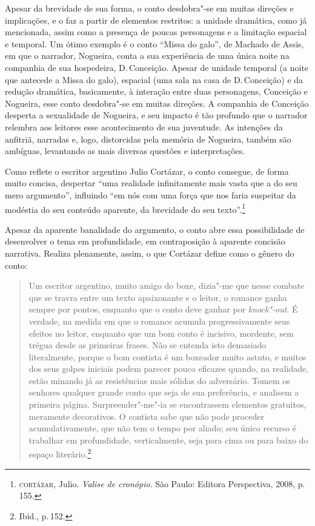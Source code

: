 Apesar da brevidade de sua forma, o conto desdobra"-se em muitas direções e implicações, e o faz a partir de elementos restritos: a unidade dramática, como já mencionada, assim como a presença de poucas personagens e a limitação espacial e temporal. Um ótimo exemplo é o conto ``Missa do galo'', de Machado de Assis, em que o narrador, Nogueira, conta a sua experiência de uma única noite na companhia de sua hospedeira, D.\,Conceição. Apesar de unidade temporal (a noite que antecede a Missa do galo), espacial (uma sala na casa de D.\,Conceição) e da redução dramática, basicamente, à interação entre duas personagens, Conceição e Nogueira, esse conto desdobra"-se em muitas direções. A companhia de Conceição desperta a sexualidade de Nogueira, e seu impacto é tão profundo que o narrador relembra aos leitores esse acontecimento de sua juventude. As intenções da anfitriã, narradas e, logo, distorcidas pela memória de Nogueira, também são ambíguas, levantando as mais diversas questões e interpretações.

Como reflete o escritor argentino Julio Cortázar, o conto consegue, de forma muito concisa, despertar ``uma realidade infinitamente mais vasta que a do seu mero argumento'', influindo ``em nós com uma força que nos faria suspeitar da modéstia do seu conteúdo aparente, da brevidade do seu texto''.\footnote{\textsc{cortázar}, Julio. \textit{Valise de cronópio}. São Paulo: Editora Perspectiva, 2008, p.\,155.}

Apesar da aparente banalidade do argumento, o conto abre essa possibilidade de desenvolver o tema em profundidade, em contraposição à aparente concisão narrativa. Realiza plenamente, assim, o que Cortázar define como o gênero do conto:

\begin{quote}
Um escritor argentino, muito amigo do boxe, dizia"-me que nesse combate que se travra entre um texto apaixonante e o leitor, o romance ganha sempre por pontos, enquanto que o conto deve ganhar por \textit{knock"-out}. É verdade, na medida em que o romance acumula progressivamente seus efeitos no leitor, enquanto que um bom conto é incisivo, mordente, sem trégua desde as primeiras frases. Não se entenda isto demasiado literalmente, porque o bom contista é um boxeador muito astuto, e muitos dos seus golpes iniciais podem parecer pouco eficazes quando, na realidade, estão minando já as resistências mais sólidas do adversário.
Tomem os senhores qualquer grande conto que seja de sua preferência, e analisem a primeira página. Surpreender"-me"-ia se encontrassem elementos gratuitos, meramente decorativos. O contista sabe que não pode proceder acumulativamente, que não tem o tempo por aliado; seu único recurso é trabalhar em profundidade, verticalmente, seja para cima ou para baixo do espaço literário.\footnote{Ibid., p.\,152.}
\end{quote}


